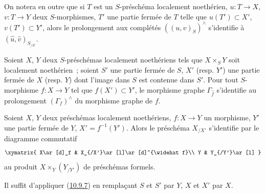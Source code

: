 On notera en outre que si $T$ est un $S$-préschéma localement
noethérien, $u:T\to X$, $v:T\to Y$ deux $S$-morphismes, $T'$ une partie
fermée de $T$ telle que $u(T')\subset X'$, $v(T')\subset Y'$, alors le
prolongement aux complétés $((u,v)_S)^\wedge$ s'identifie à
$(\widehat u,\widehat v)_{S_{/S'}}$.

\begin{corollary}[10.9.8]
\label{I.10.9.8-fr}
Soient $X$, $Y$ deux $S$-préschémas localement noethériens tels que
$X\times_S Y$ soit localement noethérien~; soient $S'$ une partie fermée
de $S$, $X'$ (resp. $Y'$) une partie fermée de $X$ (resp. $Y$) dont
l'image dans $S$ est contenue dans $S'$. Pour tout $S$-morphisme
$f:X\to Y$ tel que $f(X')\subset Y'$, le morphisme graphe
$\Gamma_{\widehat f}$ s'identifie au prolongement $(\Gamma_f)^\wedge$ du
morphisme graphe de $f$.
\end{corollary}

\begin{corollary}[10.9.9]
\label{I.10.9.9-fr}
Soient $X$, $Y$ deux préschémas localement noethériens, $f:X\to Y$ un
morphisme, $Y'$ une partie fermée de $Y$, $X'=f^{-1}(Y')$. Alors le
préschéma $X_{/X'}$ s'identifie par le diagramme commutatif
\[
  \label{I.10.9.9.1-fr}
  \xymatrix{
    X\ar[d]_f &
    X_{/X'}\ar[l]\ar[d]^{\widehat f}\\
    Y &
    Y_{/Y'}\ar[l]
  }
\]
au produit $X\times_Y(Y_{/Y'})$ de préschémas formels.
\end{corollary}

Il suffit d'appliquer (\hyperref[I.10.9.7-fr]{10.9.7}) en remplaçant
$S$ et $S'$ par $Y$, $X$ et $X'$ par $X$.
